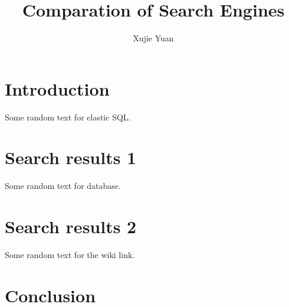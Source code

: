 \documentclass{article}
\title{Comparation of Search Engines}
\author{Xujie Yuan}
\date{}
\begin{document}
    \maketitle
    \section{Introduction}
    Some random text for elastic SQL.

    \section{Search results 1}
    Some random text for database.

    \section{Search results 2}
    Some random text for the wiki link.

    \section{Conclusion}
    
\end{document}
